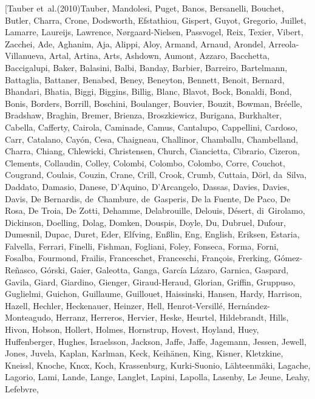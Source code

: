 \documentclass[apj, revtex4-1]{emulateapj}
\begin{document}
\begin{thebibliography}{}
\bibitem[{Tauber {et~al.}(2010)Tauber, Mandolesi, Puget, Banos, Bersanelli,
  Bouchet, Butler, Charra, Crone, Dodsworth, Efstathiou, Gispert, Guyot,
  Gregorio, Juillet, Lamarre, Laureijs, Lawrence, N{\o}rgaard-Nielsen,
  Passvogel, Reix, Texier, Vibert, Zacchei, Ade, Aghanim, Aja, Alippi, Aloy,
  Armand, Arnaud, Arondel, Arreola-Villanueva, Artal, Artina, Arts, Ashdown,
  Aumont, Azzaro, Bacchetta, Baccigalupi, Baker, Balasini, Balbi, Banday,
  Barbier, Barreiro, Bartelmann, Battaglia, Battaner, Benabed, Beney, Beneyton,
  Bennett, Benoit, Bernard, Bhandari, Bhatia, Biggi, Biggins, Billig, Blanc,
  Blavot, Bock, Bonaldi, Bond, Bonis, Borders, Borrill, Boschini, Boulanger,
  Bouvier, Bouzit, Bowman, Br{\'{e}}elle, Bradshaw, Braghin, Bremer, Brienza,
  Broszkiewicz, Burigana, Burkhalter, Cabella, Cafferty, Cairola, Caminade,
  Camus, Cantalupo, Cappellini, Cardoso, Carr, Catalano, Cay{\'{o}}n, Cesa,
  Chaigneau, Challinor, Chamballu, Chambelland, Charra, Chiang, Chlewicki,
  Christensen, Church, Ciancietta, Cibrario, Cizeron, Clements, Collaudin,
  Colley, Colombi, Colombo, Colombo, Corre, Couchot, Cougrand, Coulais, Couzin,
  Crane, Crill, Crook, Crumb, Cuttaia, D{\"{o}}rl, da~Silva, Daddato, Damasio,
  Danese, D'Aquino, D'Arcangelo, Dassas, Davies, Davies, Davis, {De Bernardis},
  de~Chambure, de~Gasperis, {De la Fuente}, {De Paco}, {De Rosa}, {De Troia},
  {De Zotti}, Dehamme, Delabrouille, Delouis, D{\'{e}}sert, di~Girolamo,
  Dickinson, Doelling, Dolag, Domken, Douspis, Doyle, Du, Dubruel, Dufour,
  Dumesnil, Dupac, Duret, Eder, Elfving, En{\ss}lin, Eng, English, Eriksen,
  Estaria, Falvella, Ferrari, Finelli, Fishman, Fogliani, Foley, Fonseca,
  Forma, Forni, Fosalba, Fourmond, Frailis, Franceschet, Franceschi,
  Fran{\c{c}}ois, Frerking, G{\'{o}}mez-Re{\~{n}}asco, G{\'{o}}rski, Gaier,
  Galeotta, Ganga, {Garc{\'{i}}a L{\'{a}}zaro}, Garnica, Gaspard, Gavila,
  Giard, Giardino, Gienger, Giraud-Heraud, Glorian, Griffin, Gruppuso,
  Guglielmi, Guichon, Guillaume, Guillouet, Haissinski, Hansen, Hardy,
  Harrison, Hazell, Hechler, Heckenauer, Heinzer, Hell, Henrot-Versill{\'{e}},
  Hern{\'{a}}ndez-Monteagudo, Herranz, Herreros, Hervier, Heske, Heurtel,
  Hildebrandt, Hills, Hivon, Hobson, Hollert, Holmes, Hornstrup, Hovest,
  Hoyland, Huey, Huffenberger, Hughes, Israelsson, Jackson, Jaffe, Jaffe,
  Jagemann, Jessen, Jewell, Jones, Juvela, Kaplan, Karlman, Keck,
  Keih{\"{a}}nen, King, Kisner, Kletzkine, Kneissl, Knoche, Knox, Koch,
  Krassenburg, Kurki-Suonio, L{\"{a}}hteenm{\"{a}}ki, Lagache, Lagorio, Lami,
  Lande, Lange, Langlet, Lapini, Lapolla, Lasenby, {Le Jeune}, Leahy, Lefebvre,
}
\end{thebibliography}
\end{document}
